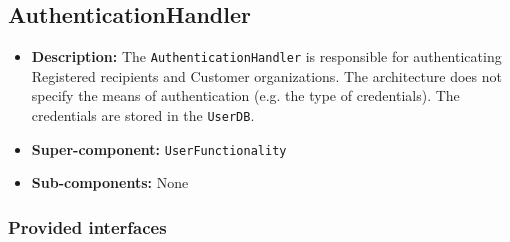 \documentclass[a4paper,10pt]{article}
\begin{document}
\subsection{AuthenticationHandler}
\begin{itemize}
    \item \textbf{Description:} The \texttt{AuthenticationHandler} is responsible for authenticating Registered recipients and Customer organizations. The architecture does not specify the means of authentication (e.g. the type of credentials). The credentials are stored in the \texttt{UserDB}.
    \item \textbf{Super-component:} \texttt{UserFunctionality}
    \item \textbf{Sub-components:} None
\end{itemize}

\subsubsection*{Provided interfaces}
\end{document}
